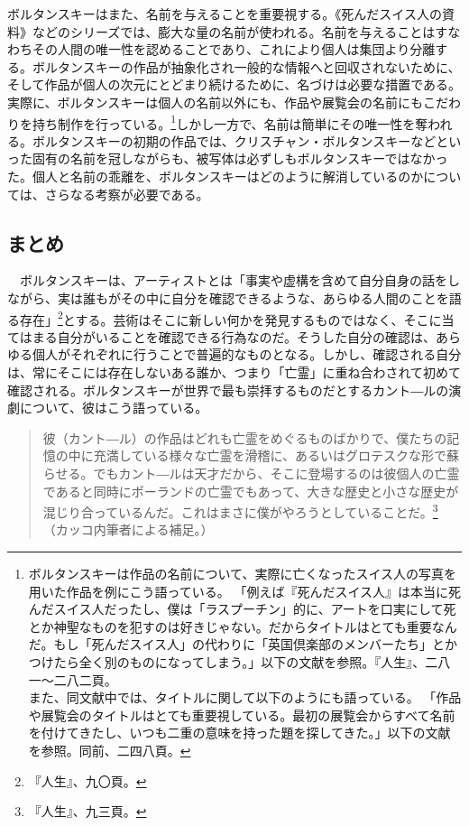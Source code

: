 \documentclass[b5j,twoside,twocolumn]{utarticle}
\begin{document}
ボルタンスキーはまた、名前を与えることを重要視する。《死んだスイス人の資料》などのシリーズでは、膨大な量の名前が使われる。名前を与えることはすなわちその人間の唯一性を認めることであり、これにより個人は集団より分離する。ボルタンスキーの作品が抽象化され一般的な情報へと回収されないために、そして作品が個人の次元にとどまり続けるために、名づけは必要な措置である。実際に、ボルタンスキーは個人の名前以外にも、作品や展覧会の名前にもこだわりを持ち制作を行っている。\footnote{ボルタンスキーは作品の名前について、実際に亡くなったスイス人の写真を用いた作品を例にこう語っている。
「例えば『死んだスイス人』は本当に死んだスイス人だったし、僕は「ラスプーチン」的に、アートを口実にして死とか神聖なものを犯すのは好きじゃない。だからタイトルはとても重要なんだ。もし「死んだスイス人」の代わりに「英国倶楽部のメンバーたち」とかつけたら全く別のものになってしまう。」以下の文献を参照。『人生』、二八一～二八二頁。\\また、同文献中では、タイトルに関して以下のようにも語っている。
「作品や展覧会のタイトルはとても重要視している。最初の展覧会からすべて名前を付けてきたし、いつも二重の意味を持った題を探してきた。」以下の文献を参照。同前、二四八頁。}しかし一方で、名前は簡単にその唯一性を奪われる。ボルタンスキーの初期の作品では、クリスチャン・ボルタンスキーなどといった固有の名前を冠しながらも、被写体は必ずしもボルタンスキーではなかった。個人と名前の乖離を、ボルタンスキーはどのように解消しているのかについては、さらなる考察が必要である。

\subsection{まとめ}
　ボルタンスキーは、アーティストとは「事実や虚構を含めて自分自身の話をしながら、実は誰もがその中に自分を確認できるような、あらゆる人間のことを語る存在」\footnote{『人生』、九〇頁。}とする。芸術はそこに新しい何かを発見するものではなく、そこに当てはまる自分がいることを確認できる行為なのだ。そうした自分の確認は、あらゆる個人がそれぞれに行うことで普遍的なものとなる。しかし、確認される自分は、常にそこには存在しないある誰か、つまり「亡霊」に重ね合わされて初めて確認される。ボルタンスキーが世界で最も崇拝するものだとするカント―ルの演劇について、彼はこう語っている。
\begin{quote}
彼（カント―ル）の作品はどれも亡霊をめぐるものばかりで、僕たちの記憶の中に充満している様々な亡霊を滑稽に、あるいはグロテスクな形で蘇らせる。でもカント―ルは天才だから、そこに登場するのは彼個人の亡霊であると同時にポーランドの亡霊でもあって、大きな歴史と小さな歴史が混じり合っているんだ。これはまさに僕がやろうとしていることだ。\footnote{『人生』、九三頁。}（カッコ内筆者による補足。） 
\end{quote}
\end{document}
